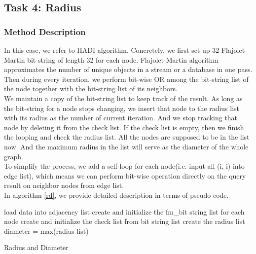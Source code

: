 \subsection{Task 4: Radius}
\subsubsection{Method Description}
In this case, we refer to HADI algorithm\cite{Kang:2011:HMR:1921632.1921634}. Concretely, we first set up 32 Flajolet-Martin bit string of length 32 for each node. Flajolet-Martin algorithm\cite{Flajolet:1985:PCA:5212.5215} approximates the number of unique objects in a stream or a database in one pass. Then during every iteration, we perform bit-wise OR among the bit-string list of the node together with the bit-string list of its neighbors. \\
We maintain a copy of the bit-string list to keep track of the result. As long as the bit-string for a node stops changing, we insert that node to the radius list with its radius as the number of current iteration. And we stop tracking that node by deleting it from the check list. If the check list is empty, then we finish the looping and check the radius list. All the nodes are supposed to be in the list now. And the maximum radius in the list will serve as the diameter of the whole graph.\\
To simplify the process, we add a self-loop for each node(i.e. input all (i, i) into edge list), which means we can perform bit-wise operation directly on the query result on neighbor nodes from edge list. \\
In algorithm \ref{rd}, we provide detailed description in terms of pseudo code.
\begin{algorithm}[htbp]
	\SetAlgoLined
	load data into adjacency list\;
	create and initialize the fm\_bit string list for each node\;
	create and initialize the check list from bit string list\;
	create the radius list\;
	diameter = max(radius list)\;
	\caption{Radius and Diameter}
	\label{rd}
\end{algorithm}

